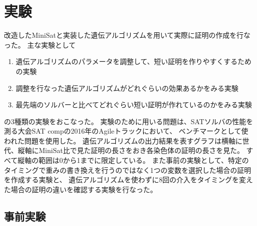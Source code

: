 
\newcommand{\myfigure}[2]{
    \begin{figure}[ht]
        \centering
        \texttt{[image: \#1]}
        \caption{#2}
        \label{fig:#2}
    \end{figure}
}

\newcommand{\reffigure}[1]{図\ref{fig:#1}(\pageref{fig:#1}ページ)}






\section{実験}





改造したMiniSatと実装した遺伝アルゴリズムを用いて実際に証明の作成を行なった。
主な実験として
\begin{enumerate}
    \item 遺伝アルゴリズムのパラメータを調整して、短い証明を作りやすくするための実験
    \item 調整を行なった遺伝アルゴリズムがどれぐらいの効果あるかをみる実験
    \item 最先端のソルバーと比べてどれぐらい短い証明が作れているのかをみる実験
\end{enumerate}
の3種類の実験をおこなった。
実験のために用いる問題は、SATソルバの性能を測る大会SAT compの2016年のAgileトラックにおいて、
ベンチマークとして使われた問題を使用した。
遺伝アルゴリズムの出力結果を表すグラフは横軸に世代、縦軸にMiniSat比で見た証明の長さをおき各染色体の証明の長さを見た。
すべて縦軸の範囲は0から1までに限定している。
また事前の実験として、特定のタイミングで重みの書き換えを行うのではなく1つの変数を選択した場合の証明を作成する実験と、
遺伝アルゴリズムを使わずに8回の介入をタイミングを変えた場合の証明の違いを確認する実験を行なった。





\setcounter{subsection}{-1} %





\subsection{事前実験}

